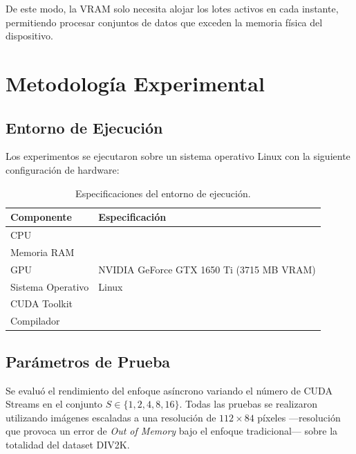 \documentclass[12pt, a4paper]{article}
\begin{document}
De este modo, la VRAM solo necesita alojar los lotes activos en cada instante,
permitiendo procesar conjuntos de datos que exceden la memoria física del
dispositivo.

\section{Metodología Experimental}

\subsection{Entorno de Ejecución}

Los experimentos se ejecutaron sobre un sistema operativo Linux con la
siguiente configuración de hardware:

\begin{table}[H]
    \centering
    \caption{Especificaciones del entorno de ejecución.}
    \label{tab:entorno}
    \begin{tabular}{ll}
        \toprule
        \textbf{Componente} & \textbf{Especificación} \\
        \midrule
        CPU          & %
                       \\
        Memoria RAM  & %
                       \\
        GPU          & NVIDIA GeForce GTX 1650 Ti (3715 MB VRAM) \\
        Sistema Operativo & Linux %
                            \\
        CUDA Toolkit & %
                       \\
        Compilador   & %
                       \\
        \bottomrule
    \end{tabular}
\end{table}

\subsection{Parámetros de Prueba}

Se evaluó el rendimiento del enfoque asíncrono variando el número de CUDA
Streams en el conjunto $S \in \{1, 2, 4, 8, 16\}$. Todas las pruebas se
realizaron utilizando imágenes escaladas a una resolución de $112 \times 84$
píxeles ---resolución que provoca un error de \textit{Out of Memory} bajo el
enfoque tradicional--- sobre la totalidad del dataset DIV2K.
\end{document}
